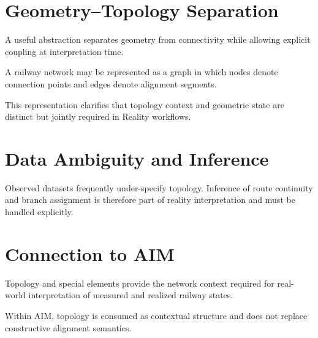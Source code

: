 \section{Geometry--Topology Separation}

A useful abstraction separates geometry from connectivity while allowing
explicit coupling at interpretation time.

\begin{definition}
A railway network may be represented as a graph in which nodes denote
connection points and edges denote alignment segments.
\end{definition}

This representation clarifies that topology context and geometric state
are distinct but jointly required in Reality workflows.

\section{Data Ambiguity and Inference}

Observed datasets frequently under-specify topology. Inference of route
continuity and branch assignment is therefore part of reality
interpretation and must be handled explicitly.

\section{Connection to AIM}

\begin{summary}
Topology and special elements provide the network context required for
real-world interpretation of measured and realized railway states.

Within AIM, topology is consumed as contextual structure and does not
replace constructive alignment semantics.
\end{summary}
